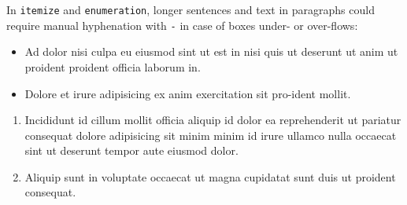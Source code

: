       In \verb|itemize| and \verb|enumeration|, longer sentences and text in paragraphs could require manual hyphenation with \verb|-| in case of boxes under- or over-flows:
      \begin{itemize}
        \item Ad dolor nisi culpa eu eiusmod sint ut est in nisi quis ut deserunt ut anim ut proident proident officia laborum in.
        \item Dolore et irure adipisicing ex anim exercitation sit pro-ident mollit.
      \end{itemize}

      \begin{enumerate}
        \item Incididunt id cillum mollit officia aliquip id dolor ea reprehenderit ut pariatur consequat dolore adipisicing sit minim minim id irure ullamco nulla occaecat sint ut deserunt tempor aute eiusmod dolor.
        \item Aliquip sunt in voluptate occaecat ut magna cupidatat sunt duis ut proident consequat.
      \end{enumerate}